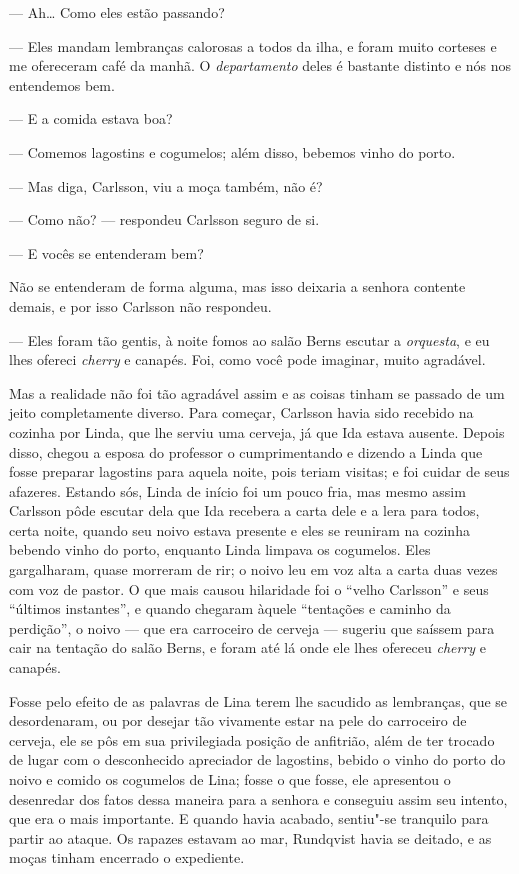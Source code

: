 --- Ah\ldots{} Como eles estão passando?

--- Eles mandam lembranças calorosas a todos da ilha, e foram muito corteses e me
ofereceram café da manhã. O \textit{departamento} deles é bastante distinto e nós nos
entendemos bem.

--- E a comida estava boa?

--- Comemos lagostins e cogumelos; além disso, bebemos vinho do porto.

--- Mas diga, Carlsson, viu a moça também, não é?

--- Como não? --- respondeu Carlsson seguro de si.

--- E vocês se entenderam bem?

Não se entenderam de forma alguma, mas isso deixaria a senhora contente demais,
e por isso Carlsson não respondeu.

--- Eles foram tão gentis, à noite fomos ao salão Berns escutar a \textit{orquesta}, e eu
lhes ofereci \textit{cherry} e canapés. Foi, como você pode imaginar, muito agradável.

Mas a realidade não foi tão agradável assim e as coisas tinham se passado de um
jeito completamente diverso. Para começar, Carlsson havia sido recebido na cozinha
por Linda, que lhe serviu uma cerveja, já que Ida estava
ausente. Depois disso, chegou a esposa do professor o cumprimentando e dizendo a
Linda que fosse preparar lagostins para aquela noite, pois teriam visitas; e foi cuidar
de seus afazeres. Estando sós, Linda de início foi um pouco fria, mas mesmo
assim Carlsson pôde escutar dela que Ida recebera a carta dele e a lera para
todos, certa noite, quando seu noivo estava presente e eles se reuniram na
cozinha bebendo vinho do porto, enquanto Linda limpava os cogumelos. Eles
gargalharam, quase morreram de rir; o noivo leu em voz alta a carta duas vezes
com voz de pastor. O que mais causou hilaridade foi o ``velho Carlsson'' e seus
``últimos instantes'', e quando chegaram àquele ``tentações e caminho da
perdição'', o noivo --- que era carroceiro de cerveja --- sugeriu que saíssem para
cair na tentação do salão Berns, e foram até lá onde ele lhes ofereceu
\textit{cherry} e canapés.

Fosse pelo efeito de as palavras de Lina terem lhe sacudido as lembranças, que se
desordenaram, ou por desejar tão vivamente estar na pele do carroceiro de
cerveja, ele se pôs em sua privilegiada posição de anfitrião, além de ter
trocado de lugar com o desconhecido apreciador de lagostins, bebido o vinho do
porto do noivo e comido os cogumelos de Lina; fosse o que fosse, ele apresentou
o desenredar dos fatos dessa maneira para a senhora e conseguiu assim seu
intento, que era o mais importante. E quando havia acabado, sentiu"-se tranquilo
para partir ao ataque. Os rapazes estavam ao mar, Rundqvist havia se deitado, e
as moças tinham encerrado o expediente.

